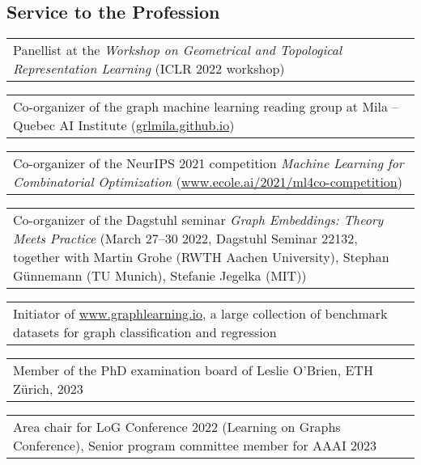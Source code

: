 \documentclass[11pt, a4paper, DIV=12]{scrartcl}
\begin{document}
\subsection*{Service to the Profession}
\begin{tabular}{p{14.5cm}}	
	Panellist at the \emph{Workshop on Geometrical and Topological Representation Learning} (ICLR 2022 workshop) \\[0.5em]
\end{tabular}

\begin{tabular}{p{14.5cm}}
	Co-organizer of the graph machine learning reading group at Mila -- Quebec AI Institute (\url{grlmila.github.io}) \\[0.5em]	
\end{tabular}

\begin{tabular}{p{14.5cm}}
Co-organizer of the NeurIPS 2021 competition \emph{Machine Learning for Combinatorial Optimization} (\url{www.ecole.ai/2021/ml4co-competition}) \\[0.5em]	
\end{tabular}

\begin{tabular}{p{14.5cm}}
Co-organizer of the Dagstuhl seminar \emph{Graph Embeddings: Theory Meets Practice} (March 27–30 2022, Dagstuhl Seminar 22132, together with Martin Grohe (RWTH Aachen University), Stephan Günnemann (TU Munich), Stefanie Jegelka (MIT)) \\[0.5em]
\end{tabular}

\begin{tabular}{p{14.5cm}}
Initiator of \url{www.graphlearning.io}, a large collection of benchmark datasets for graph classification and regression\\[0.5em]
\end{tabular}

\begin{tabular}{p{14.5cm}}	
	Member of the PhD examination board of Leslie O'Brien, ETH Zürich, 2023\\[0.5em]
\end{tabular}


\begin{tabular}{p{14.5cm}}	
Area chair for LoG Conference 2022 (Learning on Graphs Conference), Senior program committee member for AAAI 2023\\[0.5em]
\end{tabular}
\end{document}
